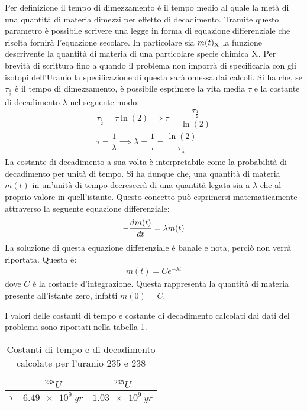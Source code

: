 \documentclass[../main]{subfiles}
\begin{document}
\begin{svol}
		Per definizione il tempo di dimezzamento è il tempo medio al quale la metà di una quantità di materia dimezzi per effetto di decadimento. Tramite questo parametro è possibile scrivere una legge in forma di equazione differenziale che risolta fornirà l'equazione secolare. In particolare sia $ m(t)_{\mathrm{X}} $ la funzione descrivente la quantità di materia di una particolare specie chimica $ \mathrm{X} $. Per brevità di scrittura fino a quando il problema non imporrà di specificarla con gli isotopi dell'Uranio la specificazione di questa sarà omessa dai calcoli. Si ha che, se $ \tau_{\frac{1}{2}} $ è il tempo di dimezzamento, è possibile esprimere la vita media $ \tau $ e la costante di decadimento $ \lambda $ nel seguente modo:
		\begin{gather}
		\tau_{\frac{1}{2}}=\tau\ln(2) \implies \tau = \dfrac{\tau_{\frac{1}{2}}}{\ln(2)} \\
		\tau = \dfrac{1}{\lambda} \implies \lambda = \dfrac{1}{\tau}=\dfrac{\ln(2)}{\tau_{\frac{1}{2}}}
		\end{gather}
		La costante di decadimento a sua volta è interpretabile come la probabilità di decadimento per unità di tempo. Si ha dunque che, una quantità di materia $ m(t) $ in un'unità di tempo decrescerà di una quantità legata sia a $ \lambda $ che al proprio valore in quell'istante. Questo concetto può esprimersi matematicamente attraverso la seguente equazione differenziale:
		\begin{gather}
			-\dfrac{d^{}m(t)}{dt^{}}=\lambda m(t)
		\end{gather}
		La soluzione di questa equazione differenziale è banale e nota, perciò non verrà riportata. Questa è:
		\begin{gather}
			m(t)=Ce^{-\lambda t}
		\end{gather}
		dove $ C $ è la costante d'integrazione. Questa rappresenta la quantità di materia presente all'istante zero, infatti $ m(0)=C $.
		
		I valori delle costanti di tempo e costante di decadimento calcolati dai dati del problema sono riportati nella tabella \ref{tbl:decayValues}.
		
		\begin{table}[h]
			\centering
			\caption{Costanti di tempo e di decadimento calcolate per l'uranio 235 e 238}
			\label{tbl:decayValues}
			\vspace{1mm}
		\begin{tabular}{c|cc}
			 
			& $^{238}U$ & $^{235}U$ \\ 
			\hline 
			$\tau$ & $\SI{6.49e9}{yr}$ & $\SI{1.03e9}{yr}$ \\ 
			 

\end{tabular}
\end{table}
\end{svol}
\end{document}
